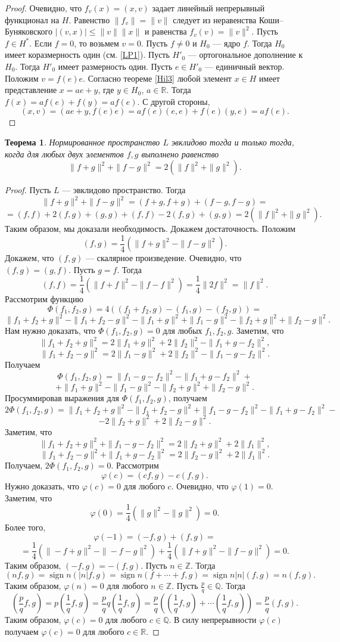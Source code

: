 \documentclass[12pt, titlepage, oneside]{amsbook}
\newcommand{\sign}{\operatorname{sign}}
\newcommand{\ZZ}{\mathbb{Z}}
\newcommand{\RR}{\mathbb{R}}
\newcommand{\QQ}{\mathbb{Q}}
\newtheorem{theorem}{Теорема}[chapter]
\theoremstyle{definition}
\theoremstyle{remark}
\begin{document}
\begin{proof}
Очевидно, что $f_v(x)=(x,v)$ задает линейный непрерывный функционал на $H$. Равенство $\|f_v\|=\|v\|$ следует из неравенства Коши--Буняковского $|(v,x)|\leq\|v\|\|x\|$ и равенства $f_v(v)=\|v\|^2$. Пусть $f\in H^*$. Если $f=0$, то возьмем $v=0$. Пусть $f\neq 0$ и $H_0$ --- ядро $f$. Тогда $H_0$ имеет коразмерность один (см. \ref{LP1}). Пусть $H'_0$ --- ортогональное дополнение к $H_0$. Тогда $H'_0$ имеет размерность один. Пусть $e\in H'_0$ --- единичный вектор. Положим $v=f(e) e$. Согласно теореме \ref{Hil3} любой элемент $x\in H$ имеет представление $x=ae+y$, где $y\in H_0$, $a\in\RR$. Тогда $f(x)=af(e)+f(y)=af(e)$. С другой стороны, $$(x,v)=(ae+y,f(e)e)=af(e)(e,e)+f(e)(y,e)=af(e).$$
\end{proof}

\begin{theorem}
\label{Ev4}
Нормированное пространство $L$ эвклидово тогда и только тогда, когда для любых двух элементов $f,g$ выполнено равенство $$\|f+g\|^2+\|f-g\|^2=2(\|f\|^2+\|g\|^2).$$
\end{theorem}

\begin{proof}
Пусть $L$ --- эвклидово пространство. Тогда $$\|f+g\|^2+\|f-g\|^2=(f+g,f+g)+(f-g,f-g)=$$ $$=(f,f)+2(f,g)+(g,g)+(f,f)-2(f,g)+(g,g)=2(\|f\|^2+\|g\|^2).$$ Таким образом, мы доказали необходимость. Докажем достаточность. Положим $$(f,g)=\frac{1}{4}(\|f+g\|^2-\|f-g\|^2).$$ Докажем, что $(f,g)$ --- скалярное произведение. Очевидно, что $(f,g)=(g,f)$. Пусть $g=f$. Тогда $$(f,f)=\frac{1}{4}(\|f+f\|^2-\|f-f\|^2)=\frac{1}{4}\|2f\|^2=\|f\|^2.$$ Рассмотрим функцию $$\Phi(f_1,f_2,g)=4((f_1+f_2,g)-(f_1,g)-(f_2,g))=$$ $$\|f_1+f_2+g\|^2-\|f_1+f_2-g\|^2-\|f_1+g\|^2+\|f_1-g\|^2-\|f_2+g\|^2+\|f_2-g\|^2.$$ Нам нужно доказать, что $\Phi(f_1,f_2,g)=0$ для любых $f_1,f_2,g$. Заметим, что $$\|f_1+f_2+g\|^2=2\|f_1+g\|^2+2\|f_2\|^2-\|f_1+g-f_2\|^2,$$ $$\|f_1+f_2-g\|^2=2\|f_1-g\|^2+2\|f_2\|^2-\|f_1-g-f_2\|^2.$$ Получаем $$\Phi(f_1,f_2,g)=\|f_1-g-f_2\|^2-\|f_1+g-f_2\|^2+$$ $$+\|f_1+g\|^2-\|f_1-g\|^2-\|f_2+g\|^2+\|f_2-g\|^2.$$ Просуммировав выражения для $\Phi(f_1,f_2,g)$, получаем $$2\Phi(f_1,f_2,g)=\|f_1+f_2+g\|^2-\|f_1+f_2-g\|^2+\|f_1-g-f_2\|^2-\|f_1+g-f_2\|^2-$$ $$-2\|f_2+g\|^2+2\|f_2-g\|^2.$$ Заметим, что $$\|f_1+f_2+g\|^2+\|f_1-g-f_2\|^2=2\|f_2+g\|^2+2\|f_1\|^2,$$ $$\|f_1+f_2-g\|^2+\|f_1+g-f_2\|^2=2\|f_2-g\|^2+2\|f_1\|^2.$$ Получаем, $2\Phi(f_1,f_2,g)=0$. Рассмотрим $$\varphi(c)=(cf,g)-c(f,g).$$ Нужно доказать, что $\varphi(c)=0$ для любого $c$. Очевидно, что $\varphi(1)=0$. Заметим, что $$\varphi(0)=\frac{1}{4}(\|g\|^2-\|g\|^2)=0.$$ Более того, $$\varphi(-1)=(-f,g)+(f,g)=$$ $$=\frac{1}{4}(\|-f+g\|^2-\|-f-g\|^2)+\frac{1}{4}(\|f+g\|^2-\|f-g\|^2)=0.$$ Таким образом, $(-f,g)=-(f,g)$. Пусть $n\in\ZZ$. Тогда $$(nf,g)=\sign n(|n|f,g)=\sign n(f+\cdots+f,g)=\sign n |n|(f,g)=n(f,g).$$ Таким образом, $\varphi(n)=0$ для любого $n\in\ZZ$. Пусть $\frac{p}{q}\in\QQ$. Тогда $$(\frac{p}{q} f,g)=p(\frac{1}{q} f,g)=\frac{p}{q}q(\frac{1}{q} f,g)=\frac{p}{q}((\frac{1}{q} f,g)+\cdots(\frac{1}{q} f,g))=\frac{p}{q}(f,g).$$ Таким образом, $\varphi(c)=0$ для любого $c\in\QQ$. В силу непрерывности $\varphi(c)$ получаем $\varphi(c)=0$ для любого $c\in\RR$.
\end{proof}
\end{document}
